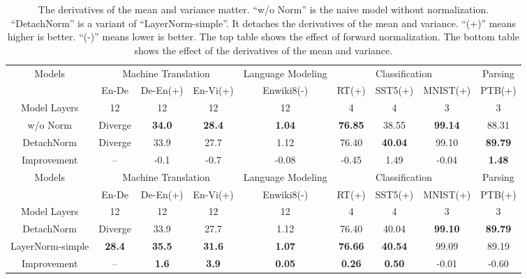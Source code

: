 \documentclass{article}
\begin{document}
\begin{table}[t]
\small
\setlength{\tabcolsep}{3pt}
\centering
\caption{ The derivatives of the mean and variance matter. ``w/o Norm'' is the naive model without normalization. ``DetachNorm'' is a variant of ``LayerNorm-simple''. It detaches the derivatives of the mean and variance. 
``(+)'' means higher is better. ``(-)'' means lower is better. The top table shows the effect of forward normalization. The bottom table shows the effect of the derivatives of the mean and variance. }
  \scalebox{0.95}
    {
 \begin{tabular}{c|ccc|c|ccc|c}
  \toprule  \multirow{2}{*}{Models}&\multicolumn{3}{c|}{Machine Translation} &\multicolumn{1}{c|}{Language Modeling} &\multicolumn{3}{c|}{ Classification}  & Parsing  \\
  \cmidrule{2-9}
 & En-De & De-En(+) & En-Vi(+) & Enwiki8(-) & RT(+)  & SST5(+) & MNIST(+) & PTB(+) \\
    \midrule   Model Layers &12 & 12 & 12 & 12 & 4 & 4 & 3 & 3\\
   \midrule   w/o Norm  & Diverge & \textbf{34.0} & \textbf{28.4} & \textbf{1.04} & \textbf{76.85} & 38.55 &\textbf{99.14} &88.31\\
\midrule
  DetachNorm & Diverge &33.9 & 27.7 & 1.12 & 76.40 &  \textbf{40.04}&99.10&\textbf{89.79}\\
  Improvement & -- &-0.1 &-0.7  & -0.08 & -0.45 & 1.49  & -0.04 & \textbf{1.48} \\
  
  \bottomrule
  \bottomrule
  \multirow{2}{*}{Models}&\multicolumn{3}{c|}{Machine Translation} &\multicolumn{1}{c|}{Language Modeling} &\multicolumn{3}{c|}{ Classification}  & Parsing  \\
  \cmidrule{2-9}
&En-De & De-En(+) & En-Vi(+) & Enwiki8(-) & RT(+)  & SST5(+)  & MNIST(+) & PTB(+) \\
    \midrule   Model Layers  &12& 12 & 12 & 12 & 4 & 4 & 3 & 3\\
\midrule 
DetachNorm & Diverge & 33.9 & 27.7 & 1.12 &76.40 & 40.04&\textbf{99.10}&\textbf{89.79}\\
\midrule
  LayerNorm-simple  & \textbf{28.4} & \textbf{35.5} &\textbf{31.6} &\textbf{1.07} & \textbf{76.66} & \textbf{40.54} & 99.09 & 89.19\\
  Improvement & -- &\textbf{1.6} & \textbf{3.9} & \textbf{0.05} & \textbf{0.26} & \textbf{0.50}&  -0.01 & -0.60 \\  
  \bottomrule \end{tabular}}
\label{tab:detach}
  \end{table}
  
\end{document}
